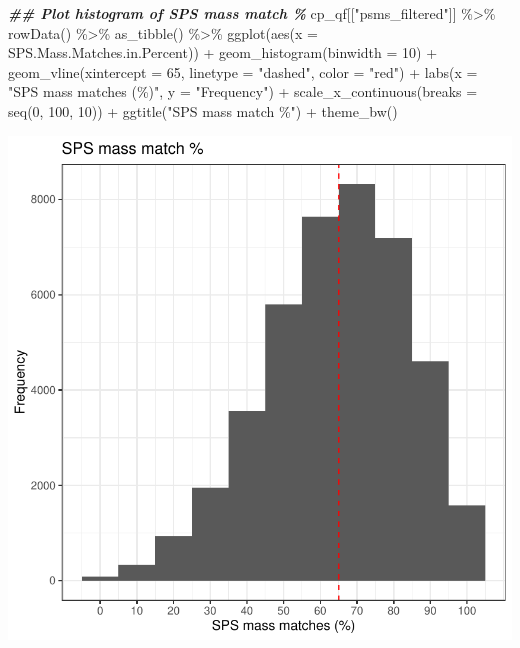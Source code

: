 \documentclass[9pt,a4paper,]{extarticle}
\newenvironment{Shaded}{\begin{snugshade}}{\end{snugshade}}
\newcommand{\AttributeTok}[1]{\textcolor[rgb]{0.77,0.63,0.00}{#1}}
\newcommand{\DecValTok}[1]{\textcolor[rgb]{0.00,0.00,0.81}{#1}}
\newcommand{\DocumentationTok}[1]{\textcolor[rgb]{0.56,0.35,0.01}{\textbf{\textit{#1}}}}
\newcommand{\FunctionTok}[1]{\textcolor[rgb]{0.00,0.00,0.00}{#1}}
\newcommand{\NormalTok}[1]{#1}
\newcommand{\SpecialCharTok}[1]{\textcolor[rgb]{0.00,0.00,0.00}{#1}}
\newcommand{\StringTok}[1]{\textcolor[rgb]{0.31,0.60,0.02}{#1}}
\begin{document}
\begin{Shaded}
\begin{Highlighting}[]
\DocumentationTok{\#\# Plot histogram of SPS mass match \%}
\NormalTok{cp\_qf[[}\StringTok{"psms\_filtered"}\NormalTok{]] }\SpecialCharTok{\%\textgreater{}\%}
  \FunctionTok{rowData}\NormalTok{() }\SpecialCharTok{\%\textgreater{}\%}
  \FunctionTok{as\_tibble}\NormalTok{() }\SpecialCharTok{\%\textgreater{}\%}
  \FunctionTok{ggplot}\NormalTok{(}\FunctionTok{aes}\NormalTok{(}\AttributeTok{x =}\NormalTok{ SPS.Mass.Matches.in.Percent)) }\SpecialCharTok{+}
  \FunctionTok{geom\_histogram}\NormalTok{(}\AttributeTok{binwidth =} \DecValTok{10}\NormalTok{) }\SpecialCharTok{+}
  \FunctionTok{geom\_vline}\NormalTok{(}\AttributeTok{xintercept =} \DecValTok{65}\NormalTok{, }\AttributeTok{linetype =} \StringTok{"dashed"}\NormalTok{, }\AttributeTok{color =} \StringTok{"red"}\NormalTok{) }\SpecialCharTok{+}
  \FunctionTok{labs}\NormalTok{(}\AttributeTok{x =} \StringTok{"SPS mass matches (\%)"}\NormalTok{, }\AttributeTok{y =} \StringTok{"Frequency"}\NormalTok{) }\SpecialCharTok{+}
  \FunctionTok{scale\_x\_continuous}\NormalTok{(}\AttributeTok{breaks =} \FunctionTok{seq}\NormalTok{(}\DecValTok{0}\NormalTok{, }\DecValTok{100}\NormalTok{, }\DecValTok{10}\NormalTok{)) }\SpecialCharTok{+}
  \FunctionTok{ggtitle}\NormalTok{(}\StringTok{"SPS mass match \%"}\NormalTok{) }\SpecialCharTok{+}
  \FunctionTok{theme\_bw}\NormalTok{()}
\end{Highlighting}
\end{Shaded}

\begin{center}\includegraphics[height=0.3\textheight]{workflow_expressions_files/figure-latex/tmt_sps_matches_2-1} \end{center}
\end{document}
